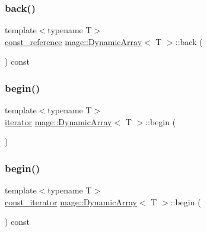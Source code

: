 \mbox{\label{classmage_1_1_dynamic_array_a6c238a20078dbeb3f00e3c05224c709a}} 
\subsubsection{\texorpdfstring{back()}{back()}\hspace{0.1cm}{\footnotesize\ttfamily [2/2]}}
{\footnotesize\ttfamily template$<$typename T$>$ \\
\mbox{\hyperlink{classmage_1_1_dynamic_array_ad2c044077223c0463e317649d4513dbc}{const\+\_\+reference}} \mbox{\hyperlink{classmage_1_1_dynamic_array}{mage\+::\+Dynamic\+Array}}$<$ T $>$\+::back (\begin{DoxyParamCaption}{ }\end{DoxyParamCaption}) const\hspace{0.3cm}{\ttfamily [noexcept]}}

\mbox{\label{classmage_1_1_dynamic_array_aaf4f02fa5341d2b46acc0d515142b8e7}} 
\subsubsection{\texorpdfstring{begin()}{begin()}\hspace{0.1cm}{\footnotesize\ttfamily [1/2]}}
{\footnotesize\ttfamily template$<$typename T$>$ \\
\mbox{\hyperlink{classmage_1_1_dynamic_array_af49b03e8ab90f3f38f6fc735cef81baf}{iterator}} \mbox{\hyperlink{classmage_1_1_dynamic_array}{mage\+::\+Dynamic\+Array}}$<$ T $>$\+::begin (\begin{DoxyParamCaption}{ }\end{DoxyParamCaption})\hspace{0.3cm}{\ttfamily [noexcept]}}

\mbox{\label{classmage_1_1_dynamic_array_a18bade4268b82f931f031a2a9f599bf9}} 
\subsubsection{\texorpdfstring{begin()}{begin()}\hspace{0.1cm}{\footnotesize\ttfamily [2/2]}}
{\footnotesize\ttfamily template$<$typename T$>$ \\
\mbox{\hyperlink{classmage_1_1_dynamic_array_ad27aa1273eb102bbd596a13a00159001}{const\+\_\+iterator}} \mbox{\hyperlink{classmage_1_1_dynamic_array}{mage\+::\+Dynamic\+Array}}$<$ T $>$\+::begin (\begin{DoxyParamCaption}{ }\end{DoxyParamCaption}) const\hspace{0.3cm}{\ttfamily [noexcept]}}

